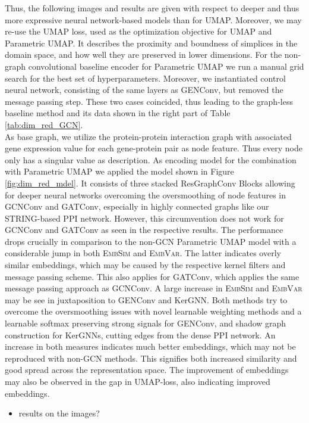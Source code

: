 \documentclass[]{article}
\begin{document}
Thus, the following images and results are given with respect to deeper and thus more expressive neural network-based models than for UMAP. Moreover, we may re-use the UMAP loss, used as the optimization objective for UMAP and Parametric UMAP. It describes the proximity and boundness of simplices in the domain space, and how well they are preserved in lower dimensions.
For the non-graph convolutional baseline encoder for Parametric UMAP we run a manual grid search for the best set of hyperparameters. Moreover, we instantiated control neural network, consisting of the same layers as GENConv, but removed the message passing step. These two cases coincided, thus leading to the graph-less baseline method and its data shown in the right part of Table \ref{tab:dim_red_GCN}.\\
As base graph, we utilize the protein-protein interaction graph with associated gene expression value for each gene-protein pair as node feature. Thus every node only has a singular value as description. As encoding model for the combination with Parametric UMAP we applied the model shown in Figure \ref{fig:dim_red_mdel}. It consists of three stacked ResGraphConv Blocks allowing for deeper neural networks overcoming the oversmoothing of node features in GCNConv and GATConv, especially in highly connected graphs like our STRING-based PPI network.
However, this circumvention does not work for GCNConv and GATConv as seen in the respective results. The performance drops crucially in comparison to the non-GCN Parametric UMAP model with a considerable jump in both \textsc{EmbSim} and \textsc{EmbVar}. The latter indicates overly similar embeddings, which may be caused by the respective kernel filters and message passing scheme. This also applies for GATConv, which applies the same message passing approach as GCNConv.
A large increase in \textsc{EmbSim} and \textsc{EmbVar} may be see in juxtaposition to GENConv and KerGNN. Both methods try to overcome the oversmoothing issues with novel learnable weighting methods and a learnable softmax preserving strong signals for GENConv, and shadow graph construction for KerGNNs, cutting edges from the dense PPI network. An increase in both measures indicates much better embeddings, which may not be reproduced with non-GCN methods. This signifies both increased similarity and good spread across the representation space. The improvement of embeddings may also be observed in the gap in UMAP-loss, also indicating improved embeddings. 

\begin{itemize}
	\item results on the images? 
\end{itemize}
\end{document}
